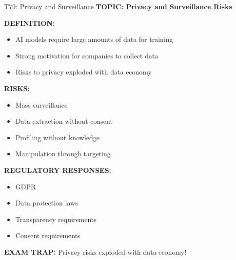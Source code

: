 \documentclass[8pt]{beamer}
\begin{document}
	\begin{frame}{T79: Privacy and Surveillance}
		\fontsize{6.5}{7.5}\selectfont
		\textbf{TOPIC: Privacy and Surveillance Risks}
		
		\vspace{0.1cm}
		\textbf{DEFINITION:}
		\begin{itemize}
			\item AI models require large amounts of data for training
			\item Strong motivation for companies to collect data
			\item Risks to privacy exploded with data economy
		\end{itemize}
		
		\vspace{0.1cm}
		\textbf{RISKS:}
		\begin{itemize}
			\item Mass surveillance
			\item Data extraction without consent
			\item Profiling without knowledge
			\item Manipulation through targeting
		\end{itemize}
		
		\vspace{0.1cm}
		\textbf{REGULATORY RESPONSES:}
		\begin{itemize}
			\item GDPR
			\item Data protection laws
			\item Transparency requirements
			\item Consent requirements
		\end{itemize}
		
		\textcolor{myred}{\textbf{EXAM TRAP:}} Privacy risks \textcolor{myblue}{exploded with data economy}!
	\end{frame}
	
	
\end{document}
